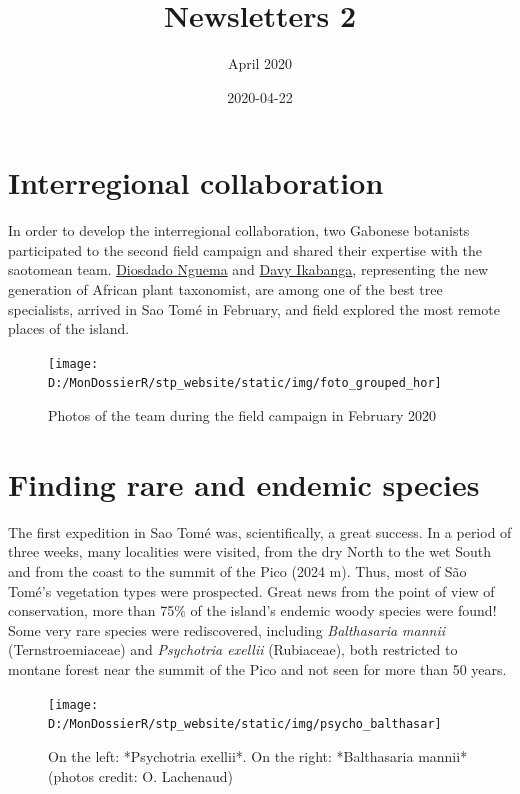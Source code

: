 \documentclass[
]{article}
\title{Newsletters 2}
\subtitle{April 2020}
\date{2020-04-22}
\begin{document}
\maketitle

\hypertarget{interregional-collaboration}{%
\section{Interregional collaboration}\label{interregional-collaboration}}

In order to develop the interregional collaboration, two Gabonese botanists participated to the second field campaign and shared their expertise with the saotomean team. \href{https://cepf-stp-threat-flora.netlify.app/authors/diosdado/}{Diosdado Nguema} and \href{https://cepf-stp-threat-flora.netlify.app/authors/davy/}{Davy Ikabanga}, representing the new generation of African plant taxonomist, are among one of the best tree specialists, arrived in Sao Tomé in February, and field explored the most remote places of the island.

\begin{figure}
\texttt{[image: D:/MonDossierR/stp\_website/static/img/foto\_grouped\_hor]} \caption{Photos of the team during the field campaign in February 2020}\label{fig:unnamed-chunk-2}
\end{figure}

\hypertarget{finding-rare-and-endemic-species}{%
\section{Finding rare and endemic species}\label{finding-rare-and-endemic-species}}

The first expedition in Sao Tomé was, scientifically, a great success. In a period of three weeks, many localities were visited, from the dry North to the wet South and from the coast to the summit of the Pico (2024 m). Thus, most of São Tomé's vegetation types were prospected. Great news from the point of view of conservation, more than 75\% of the island's endemic woody species were found! Some very rare species were rediscovered, including \emph{Balthasaria mannii} (Ternstroemiaceae) and \emph{Psychotria exellii} (Rubiaceae), both restricted to montane forest near the summit of the Pico and not seen for more than 50 years.

\begin{figure}
\texttt{[image: D:/MonDossierR/stp\_website/static/img/psycho\_balthasar]} \caption{On the left: *Psychotria exellii*. On the right: *Balthasaria mannii* (photos credit: O. Lachenaud)}\label{fig:unnamed-chunk-3}
\end{figure}
\end{document}
